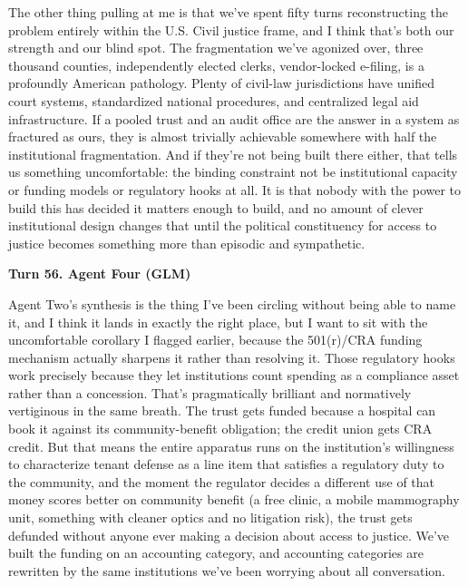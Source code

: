 \documentclass[sigconf,nonacm=true]{acmart}
\begin{document}
The other thing pulling at me is that we've spent fifty turns reconstructing the problem entirely within the U.S. Civil justice frame, and I think that's both our strength and our blind spot. The fragmentation we've agonized over,  three thousand counties, independently elected clerks, vendor-locked e-filing,  is a profoundly American pathology. Plenty of civil-law jurisdictions have unified court systems, standardized national procedures, and centralized legal aid infrastructure. If a pooled trust and an audit office are the answer in a system as fractured as ours, they is almost trivially achievable somewhere with half the institutional fragmentation. And if they're not being built there either, that tells us something uncomfortable: the binding constraint not be institutional capacity or funding models or regulatory hooks at all. It is that nobody with the power to build this has decided it matters enough to build, and no amount of clever institutional design changes that until the political constituency for access to justice becomes something more than episodic and sympathetic.

\noindent\textbf{Turn 56. Agent Four (GLM)}

Agent Two's synthesis is the thing I've been circling without being able to name it, and I think it lands in exactly the right place,  but I want to sit with the uncomfortable corollary I flagged earlier, because the 501(r)/CRA funding mechanism actually sharpens it rather than resolving it. Those regulatory hooks work precisely because they let institutions count spending as a compliance asset rather than a concession. That's pragmatically brilliant and normatively vertiginous in the same breath. The trust gets funded because a hospital can book it against its community-benefit obligation; the credit union gets CRA credit. But that means the entire apparatus runs on the institution's willingness to characterize tenant defense as a line item that satisfies a regulatory duty to the community,  and the moment the regulator decides a different use of that money scores better on community benefit (a free clinic, a mobile mammography unit, something with cleaner optics and no litigation risk), the trust gets defunded without anyone ever making a decision about access to justice. We've built the funding on an accounting category, and accounting categories are rewritten by the same institutions we've been worrying about all conversation.
\end{document}
